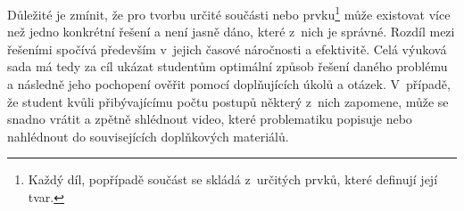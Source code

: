 Důležité je zmínit, že pro tvorbu určité součásti nebo prvku\footnote{Každý díl, popřípadě součást se skládá z~určitých prvků, které definují její tvar.} může existovat více než jedno konkrétní řešení a není jasně dáno, které z~nich je správné.
Rozdíl mezi řešeními spočívá především v~jejich časové náročnosti a efektivitě.
Celá výuková sada má tedy za cíl ukázat studentům optimální způsob řešení daného problému a následně jeho pochopení ověřit pomocí doplňujících úkolů a otázek.
V~případě, že student kvůli přibývajícímu počtu postupů některý z~nich zapomene, může se snadno vrátit a zpětně shlédnout video, které problematiku popisuje nebo nahlédnout do souvisejících doplňkových materiálů.

\newpage
